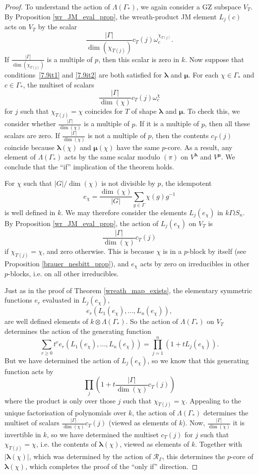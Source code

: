 \documentclass[ALCO,Unicode]{cedram}
\newcommand{\bs}{\boldsymbol}
\newcommand{\RGamma}{\mathcal{R}_{\Gamma}}
\newcommand{\LambdaG}{\Lambda(\Gamma_*)}
\newcommand{\RGamma}{\mathcal{R}_{\Gamma}}
\newcommand{\LambdaG}{\Lambda(\Gamma_*)}
\begin{document}
\begin{proof}
To understand the action of $\LambdaG$, we again consider a GZ subspace $V_T$. By Proposition \ref{wr_JM_eval_prop}, the wreath-product JM element $L_j(c)$ acts on $V_T$ by the scalar
\[
\frac{|\Gamma|}{\dim(\chi_{T(j)})} c_T(j) \omega_c^{\chi_{T(j)}}.
\]
If $\frac{|\Gamma|}{\dim(\chi_{T(j)})}$ is a multiple of $p$, then this scalar is zero in $k$. Now suppose that conditions~\ref{7.9it1} and \ref{7.9it2} are both satisfied for $\bs \lambda$ and $\bs \mu$. For each $\chi \in \Gamma_*$ and $c \in \Gamma_*$, the multiset of scalars
\[
\frac{|\Gamma|}{\dim(\chi)} c_T(j) \omega_c^{\chi}
\]
for $j$ such that $\chi_{T(j)} = \chi$ coincides for $T$ of shape $\bs \lambda$ and $\bs\mu$. To check this, we consider whether $\frac{|\Gamma|}{\dim(\chi)}$ is a multiple of $p$. If it is a multiple of $p$, then all these scalars are zero. If $\frac{|\Gamma|}{\dim(\chi)}$ is not a multiple of $p$, then the contents $c_T(j)$ coincide because $\bs\lambda(\chi)$ and $\bs\mu(\chi)$ have the same $p$-core. As a result, any element of $\LambdaG$ acts by the same scalar modulo $(\pi)$ on $V^{\bs\lambda}$ and $V^{\bs\mu}$. We conclude that the ``if'' implication of the theorem holds.

For $\chi$ such that $|G|/\dim(\chi)$ is not divisible by $p$, the idempotent
\[
e_\chi = \frac{\dim(\chi)}{|G|}\sum_{g \in \Gamma} \chi(g)g^{-1}
\]
is well defined in $k$. We may therefore consider the elements $L_j(e_\chi)$ in $k\Gamma \wr S_n$. By Proposition \ref{wr_JM_eval_prop}, the action of $L_j(e_\chi)$ on $V_T$ is
\[
\frac{|\Gamma|}{\dim(\chi)} c_T(j)
\]
if $\chi_{T(j)} = \chi$, and zero otherwise. This is because $\chi$ is in a $p$-block by itself (see Proposition \ref{brauer_nesbitt_prop}), and $e_\chi$ acts by zero on irreducibles in other $p$-blocks, i.e. on all other irreducibles.

Just as in the proof of Theorem \ref{wreath_map_exists}, the elementary symmetric functions $e_r$ evaluated in $L_j(e_\chi)$,
\[
e_r(L_1(e_\chi), \ldots, L_n(e_\chi)),
\]
are well defined elements of $k \otimes \LambdaG$. So the action of $\LambdaG$ on $V_T$ determines the action of the generating function
\[
\sum_{r \geq 0} t^r e_r(L_1(e_\chi), \ldots, L_n(e_\chi)) = \prod_{j=1}^n (1 + tL_j(e_\chi)).
\]
But we have determined the action of $L_j(e_\chi)$, so we know that this generating function acts by
\[
\prod_{j} (1 + t \frac{|\Gamma|}{\dim(\chi)} c_T(j))
\]
where the product is only over those $j$ such that $\chi_{T(j)} = \chi$. Appealing to the unique factorisation of polynomials over $k$, the action of $\LambdaG$ determines the multiset of scalars $\frac{|\Gamma|}{\dim(\chi)} c_T(j)$ (viewed as elements of $k$). Now, $\frac{|\Gamma|}{\dim(\chi)}$ it is invertible in $k$, so we have determined the multiset $c_T(j)$ for $j$ such that $\chi_{T(j)} = \chi$, i.e. the contents of $\bs\lambda(\chi)$, viewed as elements of $k$. Together with $|\bs\lambda(\chi)|$, which was determined by the action of $\RGamma$, this determines the $p$-core of $\bs\lambda(\chi)$, which completes the proof of the ``only if'' direction.
\end{proof}
\end{document}
